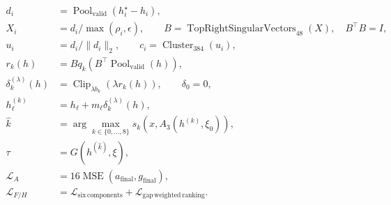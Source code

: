 \begin{align}
d_i &= \operatorname{Pool}_{\mathrm{valid}}(h_i^\star-h_i), \\
X_i &= d_i/\max(\rho_i,\epsilon),\qquad
B=\operatorname{TopRightSingularVectors}_{48}(X),\quad B^\top B=I, \\
u_i &= d_i/\lVert d_i\rVert_2,\qquad c_i=\operatorname{Cluster}_{384}(u_i), \\
r_k(h)&=Bq_k(B^\top\operatorname{Pool}_{\mathrm{valid}}(h)), \\
\delta_k^{(\lambda)}(h)&=\operatorname{Clip}_{\lambda b_k}\!\left(\lambda r_k(h)\right),\qquad\delta_0=0, \\
h_\ell^{(k)}&=h_\ell+m_\ell\delta_k^{(\lambda)}(h), \\
\widehat{k}&=\arg\max_{k\in\{0,\ldots,8\}}s_k\!\left(x,A_3(h^{(k)},\xi_0)\right), \\
\tau&=G(h^{(\widehat{k})},\xi), \\
\mathcal{L}_A&=16\operatorname{MSE}\!\left(a_{\mathrm{final}},g_{\mathrm{final}}\right), \\
\mathcal{L}_{F/H}&=\mathcal{L}_{\mathrm{six\,components}}+\mathcal{L}_{\mathrm{gap\,weighted\,ranking}}.
\end{align}
